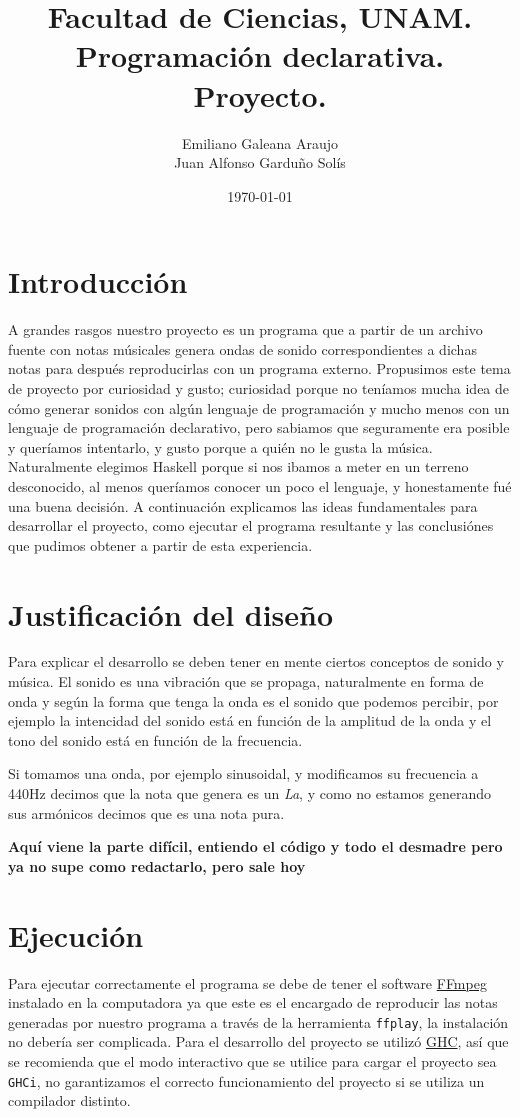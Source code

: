 \documentclass[10pt,a4paper]{article}
\title{Facultad de Ciencias, UNAM.\\Programación declarativa.\\ Proyecto.}
\author{Emiliano Galeana Araujo\\ Juan Alfonso Garduño Solís}
\date{\today}
\begin{document}
\maketitle
\section{Introducción}
\noindent A grandes rasgos nuestro proyecto es un programa que a partir de un
archivo fuente con notas músicales genera ondas de sonido correspondientes a
dichas notas  para después reproducirlas con un programa externo. Propusimos este
tema de proyecto por curiosidad y gusto; curiosidad porque no teníamos mucha idea
de cómo generar sonidos con algún lenguaje de programación y mucho menos con un
lenguaje de programación declarativo, pero sabiamos que seguramente era posible y
queríamos intentarlo, y gusto porque a quién no le gusta la música. Naturalmente
elegimos Haskell porque si nos ibamos a meter en un terreno desconocido, al menos
queríamos conocer un poco el lenguaje, y honestamente fué una buena decisión. A
continuación explicamos las ideas fundamentales para desarrollar el proyecto,
como ejecutar el programa resultante y las conclusiónes que pudimos obtener a
partir de esta experiencia. 

\section{Justificación del diseño}
\noindent Para explicar el desarrollo se deben tener en mente ciertos conceptos
de sonido y música. El sonido es una vibración que se propaga, naturalmente en
forma de onda y según la forma que tenga la onda es el sonido que podemos
percibir, por ejemplo la intencidad del sonido está en función de la amplitud de
la onda y el tono del sonido está en función de la frecuencia.

Si tomamos una onda, por ejemplo sinusoidal, y modificamos su frecuencia a 440Hz
decimos que la nota que genera es un \textit{La}, y como no estamos generando sus
armónicos decimos que es una nota pura.

\textbf{Aquí viene la parte difícil, entiendo el código y todo el desmadre pero ya no supe como redactarlo, pero sale hoy}

\section{Ejecución}
\noindent Para ejecutar correctamente el programa se debe de tener el software
\href{https://ffmpeg.org/}{FFmpeg} instalado en la computadora ya que este es el
encargado de reproducir las notas generadas por nuestro programa a través de la
herramienta \texttt{ffplay}, la instalación no debería ser complicada. Para el
desarrollo del proyecto se utilizó \href{https://www.haskell.org/ghc/}{GHC}, así
que se recomienda que el modo interactivo que se utilice para cargar el proyecto
sea \texttt{GHCi}, no garantizamos el correcto funcionamiento del proyecto si se
utiliza un compilador distinto.
\end{document}
